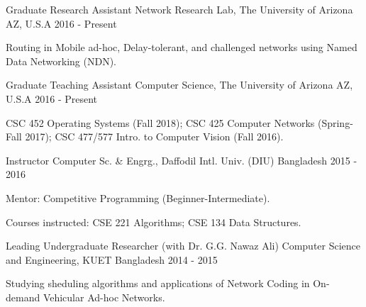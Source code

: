 

\begin{cventries}

  \cventry
    {Graduate Research Assistant} %
    {Network Research Lab, The University of Arizona} %
    {AZ, U.S.A} %
    {2016 - Present} %
    {
      \begin{cvitems} %
        \item {Routing in Mobile ad-hoc, Delay-tolerant, and challenged networks using Named Data Networking (NDN).}
      \end{cvitems}
    }
    {}

  \cventry
    {Graduate Teaching Assistant} %
    {Computer Science, The University of Arizona} %
    {AZ, U.S.A} %
    {2016 - Present} %
    {
      \begin{cvitems} %
        \item {CSC 452 Operating Systems (Fall 2018); CSC 425 Computer Networks (Spring-Fall 2017); CSC 477/577 Intro. to Computer Vision (Fall 2016).}
      \end{cvitems}
    }
    {}

  \cventry
    {Instructor} %
    {Computer Sc. \& Engrg., Daffodil Intl. Univ. (DIU)} %
    {Bangladesh} %
    {2015 - 2016} %
    {
      \begin{cvitems} %
        \item {Mentor: Competitive Programming (Beginner-Intermediate).}
        \item {Courses instructed: CSE 221 Algorithms; CSE 134 Data Structures.}
      \end{cvitems}
    }
    {}

  \cventry
    {Leading Undergraduate Researcher (with Dr. G.G. Nawaz Ali)} %
    {Computer Science and Engineering, KUET} %
    {Bangladesh} %
    {2014 - 2015} %
    {
      \begin{cvitems} %
        \item {Studying sheduling algorithms and applications of Network Coding in On-demand Vehicular Ad-hoc Networks.}
      \end{cvitems}
    }
    {}


\end{cventries}
